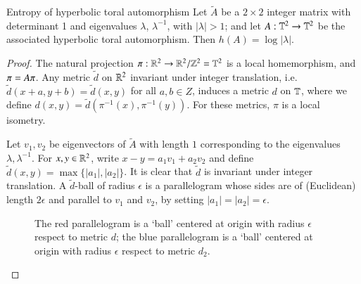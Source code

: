 \documentclass[12pt,a4paper]{article}
\begin{document}
	
	
	\begin{proposition}{Entropy of hyperbolic toral automorphism}{}
		Let $\tilde{A}$ be a $2\times 2$ integer matrix with determinant 1 and eigenvalues $\lambda$, $\lambda^{-1}$, with $|\lambda|>1$; and let $A:\mathbb{T}^2 \to \mathbb{T}^2$ be the associated hyperbolic toral automorphism. Then $h(A)=\log|\lambda|$.
	\end{proposition}
	\begin{proof}
		The natural projection $\pi:\mathbb{R}^2\rightarrow \mathbb{R}^2/\mathbb{Z}^2=\mathbb{T}^2$ is a local homemorphism, and $\pi \title{A} = A\pi$. Any metric $\tilde{d}$ on $\mathbb{R}^2$ invariant under integer translation, i.e. $\tilde{d}(x+a,y+b)=\tilde{d}(x,y)$ for all $a,b\in Z$, induces a metric $d$ on $\mathbb{T}$, where we define $d(x,y)=\tilde{d}(\pi^{-1}(x),\pi^{-1}(y))$. For these metrics, $\pi$ is a local isometry.
		
		Let $v_1,v_2$ be eigenvectors of $\tilde{A}$ with length $1$ corresponding to the eigenvalues $\lambda,\lambda^{-1}$. For $x,y\in \mathbb{R}^2$, write $x-y=a_1v_1+a_2v_2$ and define $\tilde{d}(x,y)=\max\{|a_1|,|a_2|\}$. It is clear that $\tilde{d}$ is invariant under integer translation. A $\tilde{d}$-ball of radius $\epsilon$ is a parallelogram whose sides are of (Euclidean) length $2\epsilon$ and parallel to $v_1$ and $v_2$, by setting $|a_1|=|a_2|=\epsilon$. 
		\begin{figure}
			\centering
		\caption{The red parallelogram is a `ball' centered at origin with radius $\epsilon$ respect to metric $d$; the blue parallelogram is a 	`ball' centered at origin with radius $\epsilon$ respect to metric $d_2$.}
		\end{figure}
		

\end{proof}
\end{document}
